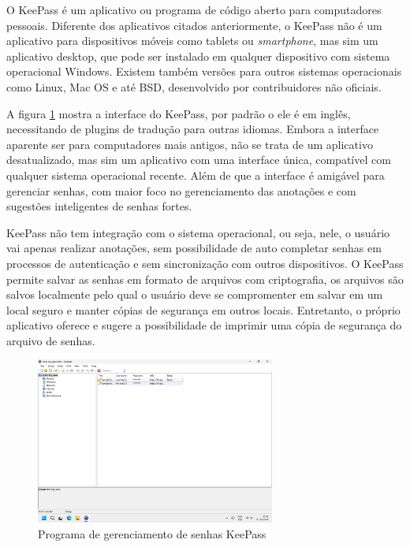 \documentclass[12pt]{article}
\begin{document}
O KeePass é um aplicativo ou programa de código aberto para computadores pessoais.
Diferente dos aplicativos citados anteriormente, o KeePass não é um aplicativo
para dispositivos móveis como tablets ou \textit{smartphone}, mas sim um aplicativo desktop,
que pode ser instalado em qualquer dispositivo com sistema operacional Windows.
Existem também versões para outros sistemas operacionais como Linux, Mac OS e até
BSD, desenvolvido por contribuidores não oficiais.

A figura \ref{fig:KeePass} mostra a interface do KeePass, por padrão o ele é em inglês,
necessitando de plugins de tradução para outras idiomas.
Embora a interface aparente ser para computadores mais antigos, não se trata de um
aplicativo desatualizado, mas sim um aplicativo com uma interface única, compatível
com qualquer sistema operacional recente.
Além de que a interface é amigável para gerenciar senhas, com maior foco no gerenciamento
das anotações e com sugestões inteligentes de senhas fortes.

KeePass não tem integração com o sistema operacional, ou seja, nele, o usuário vai apenas
realizar anotações, sem possibilidade de auto completar senhas em processos de autenticação
e sem sincronização com outros dispositivos.
O KeePass permite salvar as senhas em formato de arquivos com criptografia, os arquivos
são salvos localmente pelo qual o usuário deve se compromenter em salvar em um local
seguro e manter cópias de segurança em outros locais.
Entretanto, o próprio aplicativo oferece e sugere a possibilidade de imprimir uma cópia
de segurança do arquivo de senhas.

\begin{figure}[h!]
  \centering
  \includegraphics[width=0.7\textwidth]{./assets/keepass.png}
  \caption{Programa de gerenciamento de senhas KeePass}
  \label{fig:KeePass}
\end{figure}
\end{document}
